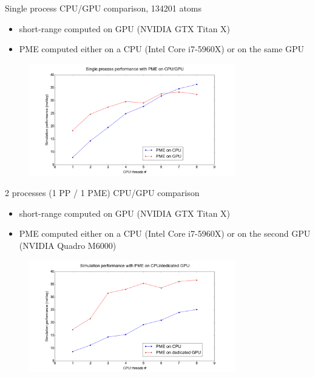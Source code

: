 \documentclass[11pt]{beamer}
\begin{document}
\begin{frame}{Single process CPU/GPU comparison, 134201 atoms}
\begin{itemize}
\item short-range computed on GPU (NVIDIA GTX Titan X)
\item PME computed either on a CPU (Intel Core i7-5960X) or on the same GPU
\end{itemize}
\FloatBarrier
\begin{figure} [h!]
    \centering
    \includegraphics[width=0.8\textwidth]{pics/CPU_GPU_ADH_SINGLE.png}
\end{figure}
\FloatBarrier
\end{frame}

\begin{frame}{2 processes (1 PP / 1 PME) CPU/GPU comparison}
\begin{itemize}
\item short-range computed on GPU (NVIDIA GTX Titan X)
\item PME computed either on a CPU (Intel Core i7-5960X) or on the second GPU (NVIDIA Quadro M6000)
\end{itemize}
\FloatBarrier
\begin{figure} [h!]
    \centering
    \includegraphics[width=0.8\textwidth]{pics/CPU_GPU_ADH.png}
    \label{fig:sepGPUNEW}
\end{figure}
\FloatBarrier
\end{frame}
\end{document}

